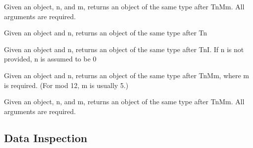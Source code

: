 \documentclass[letterpaper,10pt,english]{sphinxmanual}
\begin{document}

\begin{fulllineitems}
\label{_templates/core:core.transpose_multiply}
Given an object, n, and m, returns an object of the same type after TnMm.
All arguments are required.

\end{fulllineitems}


\begin{fulllineitems}
Given an object and n, returns an object of the same type after Tn

\end{fulllineitems}


\begin{fulllineitems}
Given an object and n, returns an object of the same type after TnI.
If n is not provided, n is assumed to be 0

\end{fulllineitems}


\begin{fulllineitems}
Given an object and n, returns an object of the same type after TnMm,
where m is required. (For mod 12, m is usually 5.)

\end{fulllineitems}


\begin{fulllineitems}
Given an object, n, and m, returns an object of the same type after TnMm.
All arguments are required.

\end{fulllineitems}



\subsection{Data Inspection}
\label{_templates/data_inspection:data-inspection}\label{_templates/data_inspection::doc}\label{_templates/data_inspection:id1}
\end{document}
